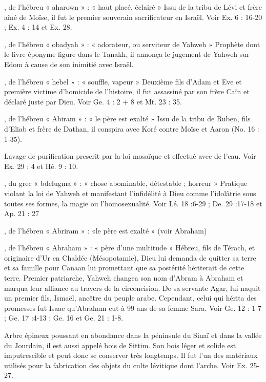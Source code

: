 \begin{multicols}{2}

, de l'hébreu « aharown » : « haut placé, éclairé »
Issu de la tribu de Lévi et frère aîné de Moïse, il fut le premier souverain sacrificateur en Israël. Voir Ex. 6 : 16-20 ; Ex. 4 : 14 et Ex. 28.

, de l'hébreu « obadyah » : « adorateur, ou serviteur de Yahweh »
Prophète dont le livre éponyme figure dans le Tanakh, il annonça le jugement de Yahweh sur Edom à cause de son inimitié avec Israël.

, de l'hébreu « hebel » : « souffle, vapeur »
Deuxième fils d'Adam et Eve et première victime d’homicide de l’histoire, il fut assassiné par son frère Caïn et déclaré juste par Dieu. Voir Ge. 4 : 2 + 8 et Mt. 23 : 35.

, de l’hébreu « Abiram » : « le père est exalté »
Issu de la tribu de Ruben, fils d'Eliab et frère de Dathan, il conspira avec Koré contre Moïse et Aaron (No. 16 : 1-35).

Lavage de purification prescrit par la loi mosaïque et effectué avec de l'eau. Voir Ex. 29 : 4 et Hé. 9 : 10.

, du grec « bdelugma » : « chose abominable, détestable ; horreur »
Pratique violant la loi de Yahweh et manifestant l’infidélité à Dieu comme l’idolâtrie sous toutes ses formes, la magie ou l’homosexualité. Voir Lé. 18 :6-29 ; De. 29 :17-18 et Ap. 21 : 27

, de l’hébreu « Abriram » : «le père est exalté »
(voir Abraham)

, de l'hébreu « Abraham » : « père d'une multitude »
Hébreu, fils de Térach, et originaire d'Ur en Chaldée (Mésopotamie), Dieu lui demanda de quitter sa terre et sa famille pour Canaan lui promettant que sa postérité hériterait de cette terre. Premier patriarche, Yahweh changea son nom d’Abram à Abraham et marqua leur alliance au travers de la circoncision. De sa servante Agar, lui naquit un premier fils, Ismaël, ancêtre du peuple arabe. Cependant, celui qui hérita des promesses fut Isaac qu’Abraham eut à 99 ans de sa femme Sara. Voir Ge. 12 : 1-7 ; Ge. 17 :4-13 ; Ge. 16 et Ge. 21 : 1-8.

Arbre épineux poussant en abondance dans la péninsule du Sinaï et dans la vallée du Jourdain, il est aussi appelé bois de Sittim. Son bois léger et solide est imputrescible et peut donc se conserver très longtemps. Il fut l’un des matériaux utilisés pour la fabrication des objets du culte lévitique dont l’arche. Voir Ex. 25-27.


\end{multicols}
